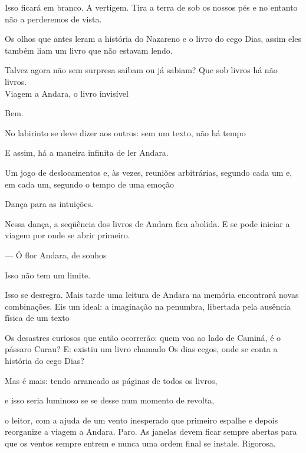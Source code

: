 Isso ficará em branco. A vertigem. Tira a terra de sob os nossos pés e
no entanto não a perderemos de vista.

Os olhos que antes leram a história do Nazareno e o livro do cego Dias,
assim eles também liam um livro que não estavam lendo.

Talvez agora não sem surpresa saibam ou já sabiam? Que sob livros há não
livros.\\

Viagem a Andara, o livro invisível

\breakk

\vspace*{4cm}

Bem.

No labirinto se deve dizer aos outros: sem um texto, não há tempo

E assim, há a maneira infinita de ler Andara.

Um jogo de deslocamentos e, às vezes, reuniões arbitrárias, segundo cada
um e, em cada um, segundo o tempo de uma emoção

Dança para as intuições.

\breakk

\vspace*{4cm}

Nessa dança, a seqüência dos livros de Andara fica abolida. E se pode
iniciar a viagem por onde se abrir primeiro.

--- Ó flor Andara, de sonhos

Isso não tem um limite.

Isso se desregra. Mais tarde uma leitura de Andara na memória encontrará
novas combinações. Eis um ideal: a imaginação na penumbra, libertada
pela ausência física de um texto

Os desastres curiosos que então ocorrerão: quem voa ao lado de Caminá, é
o pássaro Curau? E: existiu um livro chamado Os dias cegos, onde se
conta a história do cego Dias?

Mas é mais: tendo arrancado as páginas de todos os livros,

e isso seria luminoso se se desse num momento de revolta,

o leitor, com a ajuda de um vento inesperado que primeiro espalhe e
depois reorganize a viagem a Andara. Paro. As janelas devem ficar sempre
abertas para que os ventos sempre entrem e nunca uma ordem final se
instale. Rigorosa.

\breakk

\clearpage
\thispagestyle{empty}

